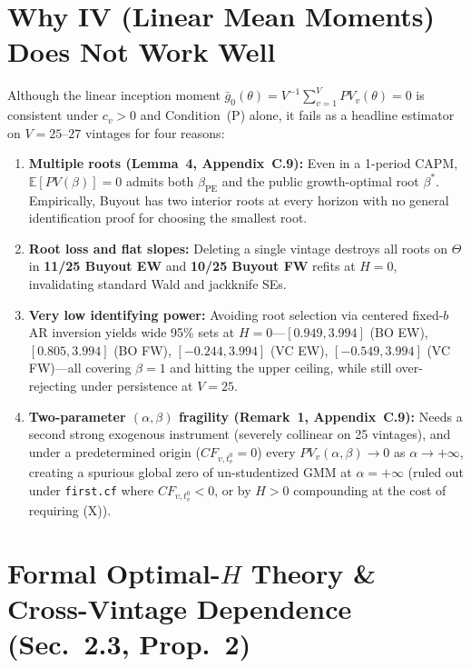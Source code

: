 \documentclass[10.5pt]{article}
\newcommand{\E}{\mathbb{E}}
\begin{document}
\section{Why IV (Linear Mean Moments) Does Not Work Well}

Although the linear inception moment $\bar g_0(\theta) = V^{-1}\sum_{v=1}^V PV_v(\theta)=0$ is consistent under $c_v>0$ and Condition~(P) alone, it fails as a headline estimator on $V=25$--$27$ vintages for four reasons:
\begin{enumerate}
  \item \textbf{Multiple roots (Lemma~4, Appendix~C.9):} Even in a 1-period CAPM, $\E[PV(\beta)]=0$ admits both $\beta_{\mathrm{PE}}$ and the public growth-optimal root $\beta^\ast$. Empirically, Buyout has two interior roots at every horizon with no general identification proof for choosing the smallest root.
  \item \textbf{Root loss and flat slopes:} Deleting a single vintage destroys all roots on $\Theta$ in \textbf{11/25 Buyout EW} and \textbf{10/25 Buyout FW} refits at $H=0$, invalidating standard Wald and jackknife SEs.
  \item \textbf{Very low identifying power:} Avoiding root selection via centered fixed-$b$ AR inversion yields wide 95\% sets at $H=0$---$[0.949,3.994]$ (BO EW), $[0.805,3.994]$ (BO FW), $[-0.244,3.994]$ (VC EW), $[-0.549,3.994]$ (VC FW)---all covering $\beta=1$ and hitting the upper ceiling, while still over-rejecting under persistence at $V=25$.
  \item \textbf{Two-parameter $(\alpha,\beta)$ fragility (Remark~1, Appendix~C.9):} Needs a second strong exogenous instrument (severely collinear on 25 vintages), and under a predetermined origin ($CF_{v,t_v^0}=0$) every $PV_v(\alpha,\beta)\to 0$ as $\alpha\to+\infty$, creating a spurious global zero of un-studentized GMM at $\alpha=+\infty$ (ruled out under \texttt{first.cf} where $CF_{v,t_v^0}<0$, or by $H>0$ compounding at the cost of requiring (X)).
\end{enumerate}

\section{Formal Optimal-$H$ Theory \& Cross-Vintage Dependence (Sec.\ 2.3, Prop.\ 2)}
\end{document}
